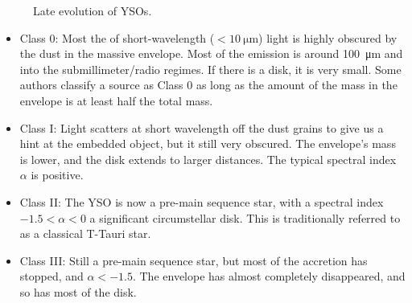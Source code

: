 \begin{figure}
\begin{center}

 \par\medskip
{}
\caption[Late evolution of YSOs]{Late evolution of YSOs.}
\label{fig:LateStages}
\end{center}
\end{figure}


\begin{itemize}
\item Class 0: Most the of short-wavelength ($<\SI{10}{\micro\meter}$) light is highly obscured by the dust in the massive envelope. Most of the emission is around \SI{100}{\micro\meter} and into the submillimeter/radio regimes. If there is a disk, it is very small. Some authors \citep{Dunham:2010bx} classify a source as Class 0 as long as the amount of the mass in the envelope is at least half the total mass.
\item Class I: Light scatters at short wavelength off the dust grains to give us a hint at the embedded object, but it still very obscured. The envelope's mass is lower, and the disk extends to larger distances. The typical spectral index $\alpha$ is positive.
\item Class II: The YSO is now a pre-main sequence star, with a spectral index $-1.5 < \alpha < 0$ a significant circumstellar disk. This is traditionally referred to as a classical T-Tauri star.
\item Class III: Still a pre-main sequence star, but most of the accretion has stopped, and $\alpha < -1.5$. The envelope has almost completely disappeared, and so has most of the disk.
\end{itemize}

